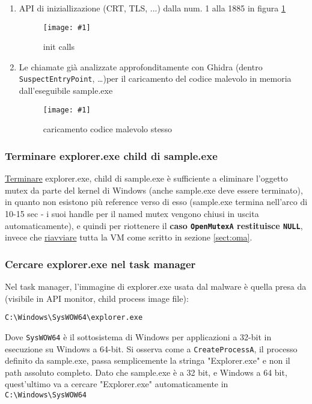 \documentclass[
    a4paper, %
    11pt %
]{article}
\newcommand{\pic}[4]{\begin{figure}[H]
            \centering
            \texttt{[image: \#1]}
            \caption{#2}
            \label{fig:#1}
            \end{figure}}
\begin{document}
            \begin{enumerate}
                \item API di iniziallizazione (CRT, TLS, ...) dalla num. 1 alla 1885 in figura \ref{fig:initcalls}
                    \pic{initcalls}{init calls}{10cm}{3.25cm}
                \item Le chiamate già analizzate approfonditamente con Ghidra (dentro \texttt{SuspectEntryPoint}, \dots)per il caricamento del codice
                    malevolo in memoria dall'eseguibile sample.exe
                    \pic{premalcode}{caricamento codice malevolo stesso}{16cm}{3.5cm}
            \end{enumerate}

            \subsubsection*{Terminare explorer.exe child di sample.exe}

            \underline{Terminare} explorer.exe, child di sample.exe è sufficiente a eliminare l'oggetto mutex da parte del
            kernel di Windows (anche sample.exe deve essere terminato), in quanto non esistono più reference verso di esso (sample.exe termina nell'arco 
            di 10-15 sec - i suoi handle per il named mutex vengono chiusi in uscita automaticamente), e quindi 
            per riottenere il \textbf{caso \texttt{OpenMutexA} restituisce \texttt{NULL}}, invece che \underline{riavviare} 
            tutta la VM come scritto in sezione \ref{sect:oma}.

            \subsubsection*{Cercare explorer.exe nel task manager}

            Nel task manager, l'immagine di explorer.exe usata dal malware è quella presa da (visibile in API
            monitor, child process image file):
            
            \begin{center}
            \texttt{C:\textbackslash Windows\textbackslash SysWOW64\textbackslash explorer.exe}
            \end{center}
            
            Dove \texttt{SysWOW64} è il sottosistema di Windows per applicazioni a 32-bit in esecuzione su Windows
            a 64-bit. Si osserva come a \texttt{CreateProcessA}, il processo definito da sample.exe, passa
            semplicemente la stringa "Explorer.exe" e non il path assoluto completo. Dato che sample.exe è a 32 bit,
            e Windows a 64 bit, quest'ultimo va a cercare "Explorer.exe" automaticamente in \texttt{C:\textbackslash Windows\textbackslash SysWOW64}
            
\end{document}
